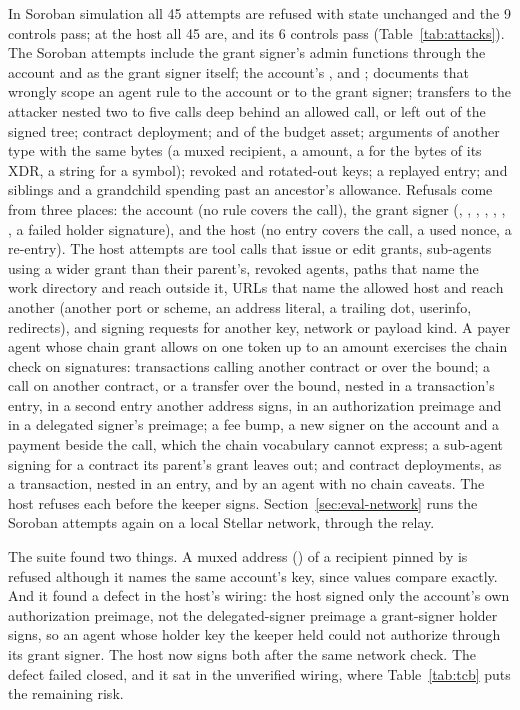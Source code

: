 In Soroban simulation all 45 attempts are refused with state unchanged and
the 9 controls pass; at the host all 45 are, and
its 6 controls pass (Table~\ref{tab:attacks}). The
Soroban attempts include the grant signer's admin functions through the
account and as the grant signer itself; the account's ,
 and ; documents that wrongly scope an
agent rule to the account or to the grant signer; transfers to the attacker
nested two to five calls deep behind an allowed call, or left out of the
signed tree; contract deployment;  and  of the
budget asset; arguments of another type with the same bytes (a muxed
recipient, a  amount, a  for the bytes of its XDR, a
string for a symbol); revoked and rotated-out keys; a replayed entry; and
siblings and a grandchild spending past an ancestor's allowance. Refusals come
from three places: the account (no rule covers the call), the grant signer
(, , ,
, , , , a
failed holder signature), and the host (no entry covers the call, a used nonce, a
re-entry). The host attempts are tool calls that issue or edit grants,
sub-agents using a wider grant than their parent's, revoked agents, paths that
name the work directory and reach outside it, URLs that name the allowed host
and reach another (another port or scheme, an address literal, a trailing
dot, userinfo, redirects), and signing requests for another key, network or
payload kind. A payer agent whose chain grant allows  on one
token up to an amount exercises the chain check on signatures: transactions
calling another contract or over the bound; a call on another contract, or a
transfer over the bound, nested in a transaction's entry, in a second entry
another address signs, in an authorization preimage and in a delegated
signer's preimage; a fee bump, a new signer on the account and a payment
beside the call, which the chain vocabulary cannot express; a sub-agent
signing for a contract its parent's grant leaves out; and contract
deployments, as a transaction, nested in an entry, and by an agent with no
chain caveats. The host refuses each before the keeper signs. Section~\ref{sec:eval-network} runs the Soroban attempts again
on a local Stellar network, through the relay.

The suite found two things. A muxed address () of a recipient
pinned by  is refused although it names the same account's key,
since values compare exactly. And it found a defect in the host's wiring: the
host signed only the account's own authorization preimage, not the
delegated-signer preimage a grant-signer holder signs, so an agent whose holder
key the keeper held could not authorize through its grant signer. The host
now signs both after the same network check. The
defect failed closed, and it sat in the unverified wiring, where
Table~\ref{tab:tcb} puts the remaining risk.

